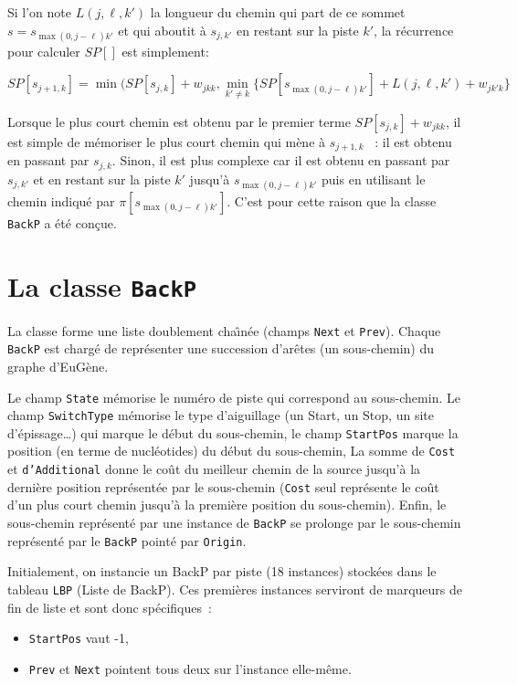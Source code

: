\documentclass[a4paper]{article}
\begin{document}
Si l'on note $L(j,\ell,k')$ la longueur du chemin qui part de ce sommet
$s= s_{\max(0,j-\ell)k'}$ et qui aboutit \`a $s_{j,k'}$ en restant sur la
piste $k'$, la r\'ecurrence pour calculer $SP[]$ est simplement:

\[SP[s_{j+1,k}] = \min(SP[s_{j,k}]+w_{jkk} , \min_{k'\neq k} \{ SP[s_{\max(0,j-\ell)k'}]+L(j,\ell,k')+w_{jk'k}\} \]

Lorsque le plus court chemin est obtenu par le premier terme
$SP[s_{j,k}]+w_{jkk}$, il est simple de m\'emoriser le plus court chemin
qui m\`ene \`a $s_{j+1,k}$ ~: il est obtenu en passant par $s_{j,k}$.
Sinon, il est plus complexe car il est obtenu en passant par
$s_{j,k'}$ et en restant sur la piste $k'$ jusqu'\`a
$s_{\max(0,j-\ell)k'}$ puis en utilisant le chemin indiqu\'e par
$\pi[s_{\max(0,j-\ell)k'}]$. C'est pour cette raison que la classe
\texttt{BackP} a \'et\'e con\c cue.

\section{La classe \texttt{BackP}}

La classe forme une liste doublement cha\^\i n\'ee (champs \texttt{Next} et
\texttt{Prev}). Chaque \texttt{BackP} est charg\'e de repr\'esenter une
succession d'ar\^etes (un sous-chemin) du graphe d'EuG\`ene. 

Le champ \texttt{State} m\'emorise le num\'ero de piste qui correspond au
sous-chemin. Le champ \texttt{SwitchType} m\'emorise le type
d'aiguillage (un Start, un Stop, un site d'\'epissage\ldots) qui marque le
d\'ebut du sous-chemin, le champ \texttt{StartPos} marque la position
(en terme de nucl\'eotides) du d\'ebut du sous-chemin, La somme de
\texttt{Cost} et \texttt{d'Additional} donne le co\^ut du meilleur
chemin de la source jusqu'\`a la derni\`ere position repr\'esent\'ee par le
sous-chemin (\texttt{Cost} seul repr\'esente le co\^ut d'un plus court
chemin jusqu'\`a la premi\`ere position du sous-chemin). Enfin, le
sous-chemin repr\'esent\'e par une instance de \texttt{BackP} se prolonge
par le sous-chemin repr\'esent\'e par le \texttt{BackP} point\'e par
\texttt{Origin}.

Initialement, on instancie un BackP par piste (18 instances) stock\'ees
dans le tableau \texttt{LBP} (Liste de BackP). Ces premi\`eres instances
serviront de marqueurs de fin de liste et sont donc sp\'ecifiques~:
\begin{itemize}
\item \texttt{StartPos} vaut -1,
\item \texttt{Prev} et \texttt{Next} pointent tous deux sur l'instance
  elle-m\^eme.
\end{itemize}
\end{document}
